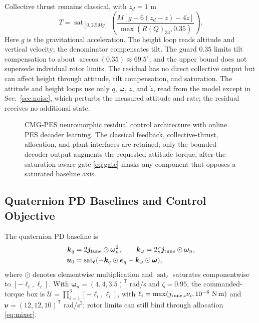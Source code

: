 \documentclass[letterpaper, 10 pt, conference]{ieeeconf}
\newcommand{\T}{^{\mathsf T}}
\newcommand{\sat}{\operatorname{sat}}
\begin{document}
Collective thrust remains classical, with $z_d=1$ m
\begin{equation}
 T=\sat_{[0,2.5Mg]}
 \left(\frac{M[g+6(z_d-z)-4\dot z]}{\max(R(Q)_{33},0.35)}\right).
 \label{eq:collective}
\end{equation}
Here $g$ is the gravitational acceleration. The height loop reads altitude and vertical velocity; the denominator compensates tilt. The guard $0.35$ limits tilt compensation to about $\arccos(0.35)\approx69.5^\circ$, and the upper bound does not supersede individual rotor limits. The residual has no direct collective output but can affect height through attitude, tilt compensation, and saturation. The attitude and height loops use only $q$, $\bm\omega$, $z$, and $\dot z$, read from the model except in Sec.~\ref{sec:noise}, which perturbs the measured attitude and rate; the residual receives no additional state.

\begin{figure}[!th]
    \centering
    \resizebox{0.84\textwidth}{!}{}
    \caption{CMG-PES neuromorphic residual control architecture with online PES decoder learning. The classical feedback, collective-thrust, allocation, and plant interfaces are retained; only the bounded decoder output augments the requested attitude torque, after the saturation-aware gate \eqref{eq:gate} masks any component that opposes a saturated baseline axis.}
    \label{fig:arch}
\end{figure}

\subsection{Quaternion PD Baselines and Control Objective}

The quaternion PD baseline is
\begin{align}
 \bm k_q&=2\bm j_{\rm tune}\odot\bm\omega_n^2,\qquad
 \bm k_\omega=2\zeta\bm j_{\rm tune}\odot\bm\omega_n,\\
 \bm u_0&=\sat_{\bm\ell}(-\bm k_q\odot\bm e_q-\bm k_\omega\odot\bm\omega),
 \label{eq:pd}
\end{align}
where $\odot$ denotes elementwise multiplication and $\sat_{\bm\ell}$ saturates componentwise to $[-\ell_i,\ell_i]$. With $\bm\omega_n=(4,4,3.5)\T$ rad/s and $\zeta=0.95$, the commanded-torque box is $\mathcal U=\prod_{i=1}^3[-\ell_i,\ell_i]$, with $\ell_i=\max(j_{{\rm tune},i}\nu_i,10^{-6}\ \mathrm{N\,m})$ and $\bm\nu=(12,12,10)\T$ rad/s$^2$; rotor limits can still bind through allocation \eqref{eq:mixer}.
\end{document}
